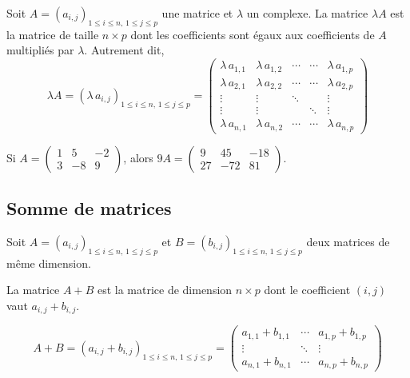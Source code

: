 \documentclass[11pt,fleqn]{book} %
\begin{document}
\begin{definition} Soit $A = (a_{i,j})_{ 1 \leqslant i \leqslant n ,\, 1 \leqslant j \leqslant p}$ une matrice et $\lambda$ un complexe. La matrice $\lambda A$ est la matrice de taille $n \times p$ dont les coefficients sont égaux aux coefficients de $A$ multipliés par $\lambda$. Autrement dit,
\[ \lambda A = (\lambda\, a_{i,j})_{ 1 \leqslant i \leqslant n ,\, 1 \leqslant j \leqslant p} =  \begin{pmatrix} \lambda\,a_{1,1} & \lambda\,a_{1,2} & \cdots & \cdots & \lambda\,a_{1,p} \\
\lambda\,a_{2,1} & \lambda\,a_{2,2} & \cdots & \cdots & \lambda\,a_{2,p} \\
\vdots & \vdots & \ddots & & \vdots \\
\vdots & \vdots & & \ddots & \vdots \\
\lambda\,a_{n,1} & \lambda\,a_{n,2} & \cdots & \cdots & \lambda\,a_{n,p} \end{pmatrix}\]\end{definition}

\begin{example} Si $A = \begin{pmatrix}
1 & 5 & -2 \\ 
3 & -8 & 9
\end{pmatrix}$, alors $9A = \begin{pmatrix}
 9 & 45 & -18 \\ 27 & -72 & 81
\end{pmatrix}$.\end{example}

\subsection{Somme de matrices}

\begin{definition}Soit $A = (a_{i,j})_{ 1 \leqslant i \leqslant n ,\, 1 \leqslant j \leqslant p}$ et $B = (b_{i,j})_{ 1 \leqslant i \leqslant n ,\, 1 \leqslant j \leqslant p}$ deux matrices de même dimension.

La matrice $A+B$ est la matrice de dimension $n \times p$ dont le coefficient $(i,j)$ vaut $a_{i,j}+b_{i,j}$.

\[A+B = (a_{i,j}+b_{i,j})_{ 1 \leqslant i \leqslant n ,\, 1 \leqslant j \leqslant p} = \begin{pmatrix} a_{1,1} + b_{1,1} & \cdots & a_{1,p} +b_{1,p} \\
\vdots & \ddots  & \vdots \\
a_{n,1} + b_{n,1} & \cdots &a_{n,p} +b_{n,p}\end{pmatrix}\]\end{definition}
\end{document}
